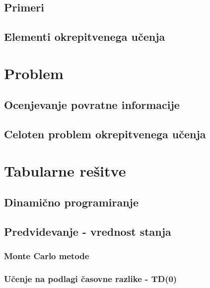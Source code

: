 \documentclass[a4paper, oneside, 12pt]{article}
\begin{document}



\subsection{Primeri}
\subsection{Elementi okrepitvenega učenja}
\newpage

\section{Problem}
\label{section:problem}
\subsection{Ocenjevanje povratne informacije}
\subsection{Celoten problem okrepitvenega učenja}
\newpage

\section{Tabularne rešitve}
\subsection{Dinamično programiranje}
\subsection{Predvidevanje - vrednost stanja}
\subsubsection{Monte Carlo metode}
\subsubsection{Učenje na podlagi časovne razlike - TD(0)}
\end{document}
